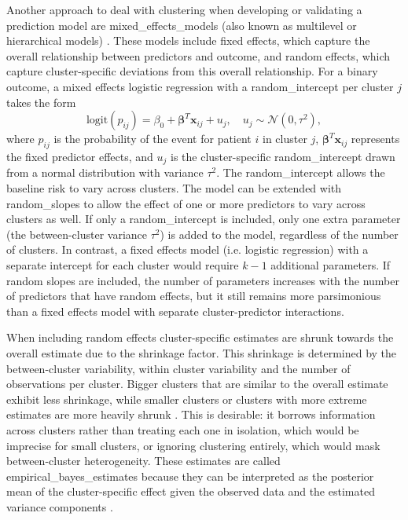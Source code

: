 Another approach to deal with clustering when developing or validating a prediction model are \glspl{mixed_effects_model} (also known as multilevel or hierarchical models) \cite{snijdersMultilevelAnalysisIntroduction2012,wynantsUntappedPotentialMulticenter2019}. These models include fixed effects, which capture the overall relationship between predictors and outcome, and random effects, which capture cluster-specific deviations from this overall relationship. For a binary outcome, a mixed effects logistic regression with a \gls{random_intercept} per cluster $j$ takes the form
\begin{equation}
\text{logit}(p_{ij}) = \beta_0 + \boldsymbol{\beta}^T \mathbf{x}_{ij} + u_j, \quad u_j \sim \mathcal{N}(0, \tau^2),
\end{equation}
where $p_{ij}$ is the probability of the event for patient $i$ in cluster $j$, $\boldsymbol{\beta}^T \mathbf{x}_{ij}$ represents the fixed predictor effects, and $u_j$ is the cluster-specific \gls{random_intercept} drawn from a normal distribution with variance $\tau^2$. The \gls{random_intercept} allows the baseline risk to vary across clusters. The model can be extended with \glspl{random_slope} to allow the effect of one or more predictors to vary across clusters as well. If only a \gls{random_intercept} is included, only one extra parameter (the between-cluster variance $\tau^2$) is added to the model, regardless of the number of clusters. In contrast, a fixed effects model (i.e. logistic regression) with a separate intercept for each cluster would require $k-1$ additional parameters. If random slopes are included, the number of parameters increases with the number of predictors that have random effects, but it still remains more parsimonious than a fixed effects model with separate cluster-predictor interactions.

When including random effects cluster-specific estimates are shrunk towards the overall estimate due to the \gls{shrinkage} factor. This \gls{shrinkage} is determined by the between-cluster variability, within cluster variability and the number of observations per cluster. Bigger clusters that are similar to the overall estimate exhibit less \gls{shrinkage}, while smaller clusters or clusters with more extreme estimates are more heavily shrunk \cite{wynantsDoesIgnoringClustering2018}. This is desirable: it borrows information across clusters rather than treating each one in isolation, which would be imprecise for small clusters, or ignoring clustering entirely, which would mask between-cluster \gls{heterogeneity}. These estimates are called \gls{empirical_bayes_estimates} because they can be interpreted as the posterior mean of the cluster-specific effect given the observed data and the estimated variance components \cite{snijdersMultilevelAnalysisIntroduction2012}.

